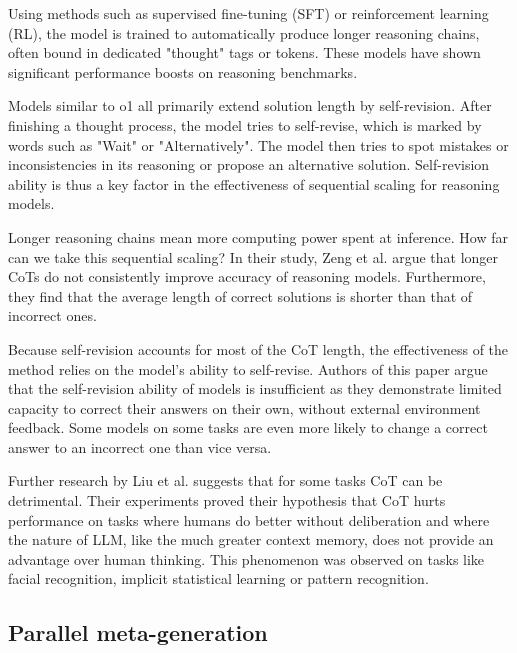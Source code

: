 Using methods such as supervised fine-tuning (SFT) or reinforcement learning (RL), the model is trained to
automatically produce longer reasoning chains, often bound in dedicated "thought" tags or tokens. 
These models have shown significant performance boosts on reasoning benchmarks\cite{openai2024openaio1card}\cite{deepseekai2025deepseekr1incentivizingreasoningcapability}.

Models similar to o1 all primarily extend solution length by self-revision\cite{zeng2025revisitingtesttimescalingo1like}.
After finishing a thought process, the model tries to self-revise, which is marked by words such as "Wait" or "Alternatively". 
The model then tries to spot mistakes or inconsistencies in its reasoning or propose an alternative solution. 
Self-revision ability is thus a key factor in the effectiveness of sequential scaling for reasoning models\cite{zeng2025revisitingtesttimescalingo1like}.

Longer reasoning chains mean more computing power spent at inference. How far can we take this sequential scaling?
In their study, Zeng et al.\cite{zeng2025revisitingtesttimescalingo1like} argue that longer CoTs do not consistently improve accuracy of reasoning models.
Furthermore, they find that the average length of correct solutions is shorter than that of incorrect ones. 

Because self-revision accounts for most of the CoT length, the effectiveness of the method relies on the model's ability to self-revise.
Authors of this paper argue that the self-revision ability of models is insufficient as they demonstrate limited capacity to correct their answers
on their own, without external environment feedback. Some models on some tasks are even more likely to change a correct answer to an incorrect one than vice versa.

Further research by Liu et al.\cite{liu2024mindstepbystep} suggests that for some tasks CoT can be detrimental.
Their experiments proved their hypothesis that CoT hurts performance on tasks where humans do better without deliberation
and where the nature of LLM, like the much greater context memory, does not provide an advantage over human thinking. 
This phenomenon was observed on tasks like facial recognition, implicit statistical learning or pattern recognition.

\subsection{Parallel meta-generation}

